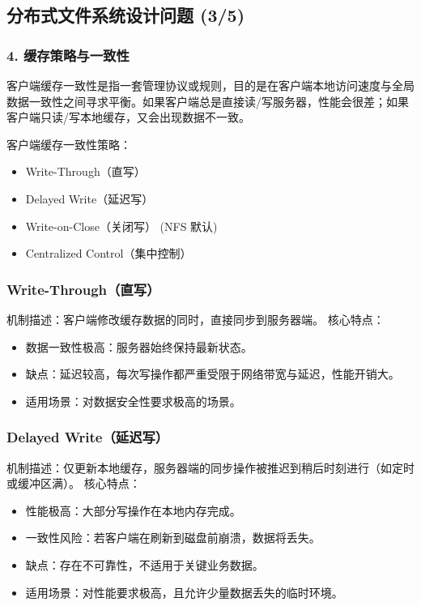 \subsection{分布式文件系统设计问题 (3/5)}

\subsubsection{4. 缓存策略与一致性}

客户端缓存一致性是指一套管理协议或规则，目的是在客户端本地访问速度与全局数据一致性之间寻求平衡。如果客户端总是直接读/写服务器，性能会很差；如果客户端只读/写本地缓存，又会出现数据不一致。

客户端缓存一致性策略：
\begin{itemize}
    \item Write-Through（直写）
    \item Delayed Write（延迟写）
    \item Write-on-Close（关闭写） (NFS 默认)
    \item Centralized Control（集中控制）
\end{itemize}

\subsubsection{Write-Through（直写）}
机制描述：客户端修改缓存数据的同时，直接同步到服务器端。
核心特点：
\begin{itemize}
    \item 数据一致性极高：服务器始终保持最新状态。
    \item 缺点：延迟较高，每次写操作都严重受限于网络带宽与延迟，性能开销大。
    \item 适用场景：对数据安全性要求极高的场景。
\end{itemize}

\subsubsection{Delayed Write（延迟写）}
机制描述：仅更新本地缓存，服务器端的同步操作被推迟到稍后时刻进行（如定时或缓冲区满）。
核心特点：
\begin{itemize}
    \item 性能极高：大部分写操作在本地内存完成。
    \item 一致性风险：若客户端在刷新到磁盘前崩溃，数据将丢失。
    \item 缺点：存在不可靠性，不适用于关键业务数据。
    \item 适用场景：对性能要求极高，且允许少量数据丢失的临时环境。
\end{itemize}

